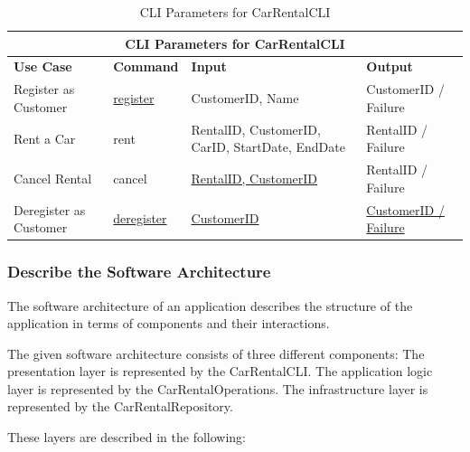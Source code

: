 \begin{table}
      \centering
      \caption{CLI Parameters for CarRentalCLI}
      \label{tab:cli_parameters_car_rental_cli}
      \begin{tabular}{|p{4cm}|p{2cm}|p{4cm}|p{5cm}|}
            \hline
            \multicolumn{4}{|c|}{\textbf{CLI Parameters for CarRentalCLI}} \\
            \hline
            \textbf{Use Case} & \textbf{Command} & \textbf{Input} & \textbf{Output} \\
            \hline
            Register as Customer & \underline{register} & CustomerID, Name & CustomerID / Failure \\
            \hline
            Rent a Car & rent & RentalID, CustomerID, CarID, StartDate, EndDate & RentalID / Failure \\
            \hline
            Cancel Rental & cancel & \underline{RentalID, CustomerID} & RentalID / Failure \\
            \hline
            Deregister as Customer & \underline{deregister} & \underline{CustomerID} & \underline{CustomerID / Failure} \\
            \hline
      \end{tabular}
\end{table}

\subsubsection*{Describe the Software Architecture}
The software architecture of an application describes the structure of the application in terms of components and their interactions.

The given software architecture consists of three different components:
The presentation layer is represented by the CarRentalCLI.
The application logic layer is represented by the CarRentalOperations.
The infrastructure layer is represented by the CarRentalRepository.

These layers are described in the following:
